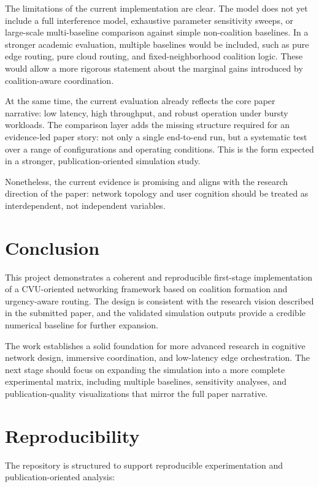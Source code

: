 \documentclass[11pt]{article}
\begin{document}
The limitations of the current implementation are clear. The model does not yet include a full interference model, exhaustive parameter sensitivity sweeps, or large-scale multi-baseline comparison against simple non-coalition baselines. In a stronger academic evaluation, multiple baselines would be included, such as pure edge routing, pure cloud routing, and fixed-neighborhood coalition logic. These would allow a more rigorous statement about the marginal gains introduced by coalition-aware coordination.

At the same time, the current evaluation already reflects the core paper narrative: low latency, high throughput, and robust operation under bursty workloads. The comparison layer adds the missing structure required for an evidence-led paper story: not only a single end-to-end run, but a systematic test over a range of configurations and operating conditions. This is the form expected in a stronger, publication-oriented simulation study.

Nonetheless, the current evidence is promising and aligns with the research direction of the paper: network topology and user cognition should be treated as interdependent, not independent variables.

\section{Conclusion}
This project demonstrates a coherent and reproducible first-stage implementation of a CVU-oriented networking framework based on coalition formation and urgency-aware routing. The design is consistent with the research vision described in the submitted paper, and the validated simulation outputs provide a credible numerical baseline for further expansion.

The work establishes a solid foundation for more advanced research in cognitive network design, immersive coordination, and low-latency edge orchestration. The next stage should focus on expanding the simulation into a more complete experimental matrix, including multiple baselines, sensitivity analyses, and publication-quality visualizations that mirror the full paper narrative.

\section{Reproducibility}
The repository is structured to support reproducible experimentation and publication-oriented analysis:
\end{document}
